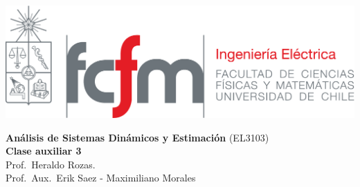 \documentclass[
  11pt,
  letterpaper,
   addpoints,
   answers
  ]{exam}
\begin{document}
\noindent
\begin{minipage}{0.47\textwidth}
\includegraphics[width=\textwidth]{../fcfm_die}
\end{minipage}
\begin{minipage}{0.53\textwidth}
\begin{center} 
\large\textbf{Análisis de Sistemas Dinámicos y Estimación} (EL3103) \\
\large\textbf{Clase auxiliar 3} \\
\normalsize Prof.~Heraldo Rozas.\\
\normalsize Prof.~Aux.~Erik Saez - Maximiliano Morales
\end{center}
\end{minipage}

\vspace{0.5cm}
\noindent
\vspace{.85cm}
\end{document}
